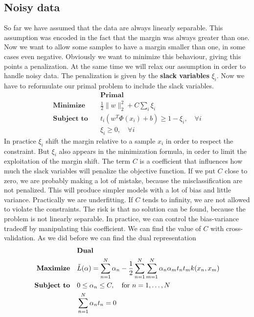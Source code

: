 \documentclass[../main.tex]{subfiles}
\begin{document}
\subsection{Noisy data}
So far we have assumed that the data are always linearly separable. This assumption was encoded in the fact that the margin was always greater than one. Now we want to allow some samples to have a margin smaller than one, in some cases even negative. Obviously we want to minimize this behaviour, giving this points a penalization. At the same time we will relax our assumption in order to handle noisy data. The penalization is given by the \textbf{slack variables} $\xi_i$. Now we have to reformulate our primal problem to include the slack variables.
\newpage
\begin{align*}
                              & \textbf{Primal}                                         \\
    \textbf{Minimize} \quad   & \frac{1}{2} \|w\|_2^2 + C\sum_i \xi_i                   \\
    \textbf{Subject to} \quad & t_i (w^T \Phi(x_i) + b) \geq 1 - \xi_i, \quad \forall i \\
                              & \xi_i \geq 0, \quad \forall i
\end{align*}
In practice $\xi_i$ shift the margin relative to a sample $x_i$ in order to respect the constraint. But $\xi_i$ also appears in the minimization formula, in order to limit the exploitation of the margin shift. The term $C$ is a coefficient that influences how much the slack variables will penalize the objective function. If we put $C$ close to zero, we are probably making a lot of mistake, because the misclassification are not penalized. This will produce simpler models with a lot of bias and little variance. Practically we are underfitting. If $C$ tends to infinity, we are not allowed to violate the constraints. The risk is that no solution can be found, because the problem is not linearly separable. In practice, we can control the bias-variance tradeoff by manipulating this coefficient. We can find the value of $C$ with cross-validation.
As we did before we can find the dual representation
\begin{align*}
                              & \textbf{Dual}                                                                                                         \\
    \textbf{Maximize} \quad   & \Tilde{L}(\alpha) = \sum_{n=1}^N \alpha_n - \frac{1}{2}\sum_{n=1}^N \sum_{m=1}^N \alpha_n \alpha_m t_n t_m k(x_n,x_m) \\
    \textbf{Subject to} \quad & 0 \leq \alpha_n \leq C, \quad \text{for } n=1, \dots, N                                                               \\
                              & \sum_{n=1}^N \alpha_n t_n = 0
\end{align*}
\end{document}
